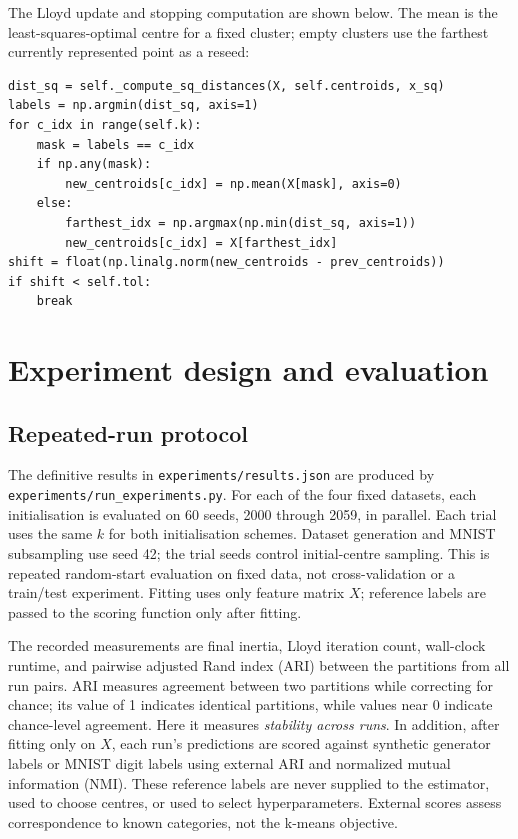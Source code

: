 \documentclass[10pt,a4paper]{article}
\begin{document}
The Lloyd update and stopping computation are shown below. The mean is the least-squares-optimal centre for a fixed cluster; empty clusters use the farthest currently represented point as a reseed:
\begin{lstlisting}
dist_sq = self._compute_sq_distances(X, self.centroids, x_sq)
labels = np.argmin(dist_sq, axis=1)
for c_idx in range(self.k):
    mask = labels == c_idx
    if np.any(mask):
        new_centroids[c_idx] = np.mean(X[mask], axis=0)
    else:
        farthest_idx = np.argmax(np.min(dist_sq, axis=1))
        new_centroids[c_idx] = X[farthest_idx]
shift = float(np.linalg.norm(new_centroids - prev_centroids))
if shift < self.tol:
    break
\end{lstlisting}

\section{Experiment design and evaluation}
\subsection{Repeated-run protocol}
The definitive results in \texttt{experiments/results.json} are produced by \texttt{experiments/run\_experiments.py}. For each of the four fixed datasets, each initialisation is evaluated on 60 seeds, 2000 through 2059, in parallel. Each trial uses the same $k$ for both initialisation schemes. Dataset generation and MNIST subsampling use seed 42; the trial seeds control initial-centre sampling. This is repeated random-start evaluation on fixed data, not cross-validation or a train/test experiment. Fitting uses only feature matrix $X$; reference labels are passed to the scoring function only after fitting.

The recorded measurements are final inertia, Lloyd iteration count, wall-clock runtime, and pairwise adjusted Rand index (ARI) between the partitions from all run pairs. ARI measures agreement between two partitions while correcting for chance; its value of 1 indicates identical partitions, while values near 0 indicate chance-level agreement. Here it measures \emph{stability across runs}. In addition, after fitting only on $X$, each run's predictions are scored against synthetic generator labels or MNIST digit labels using external ARI and normalized mutual information (NMI). These reference labels are never supplied to the estimator, used to choose centres, or used to select hyperparameters. External scores assess correspondence to known categories, not the k-means objective.
\end{document}
